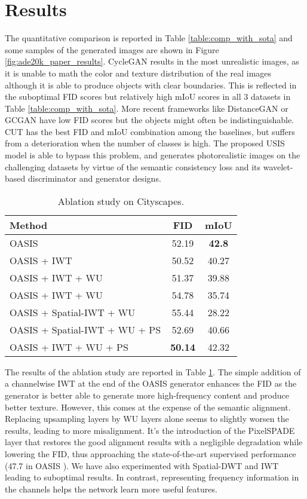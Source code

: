 \documentclass{article}
\begin{document}
 \vspace{-1.7em}
\section{Results}
\label{sec:results}
\vspace{-1em}
The quantitative comparison is reported in Table \ref{table:comp_with_sota} and some samples of the generated images are shown in Figure \ref{fig:ade20k_paper_results}. CycleGAN results in the most unrealistic images, as it is unable to math the color and texture distribution of the real images although it is able to produce objects with clear boundaries. This is reflected in the suboptimal FID scores but relatively high mIoU scores in all 3 datasets in Table \ref{table:comp_with_sota}. More recent frameworks like DistanceGAN or GCGAN have low FID scores but the objects might often be indistinguishable. CUT has the best FID and mIoU combination among the baselines, but suffers from a deterioration when the number of classes is high. The proposed USIS model is able to bypass this problem, and generates photorealistic images on the challenging datasets by virtue of the semantic consistency loss and its wavelet-based discriminator and generator designs.    
\begin{table}[h]
    \begin{tabular}{l|cc}
         Method & FID & mIoU  \\ 
         \hline
         OASIS                         & 52.19 & \textbf{42.8}  \\
         OASIS + IWT                   & 50.52 & 40.27 \\
         OASIS + IWT + WU              & 51.37 & 39.88 \\
         OASIS + IWT + WU        & 54.78 & 35.74 \\
         OASIS + Spatial-IWT + WU      & 55.44 & 28.22 \\
         OASIS + Spatial-IWT + WU + PS & 52.69 & 40.66 \\
         OASIS + IWT + WU + PS         & \textbf{50.14} & 42.32 \\
         
    \end{tabular}
\caption{Ablation study on Cityscapes.}
\label{tab:ablation}
\vspace{-1.5em}
\end{table} 
The results of the ablation study are reported in Table \ref{tab:ablation}. The simple addition of a channelwise IWT at the end of the OASIS generator enhances the FID as the generator is better able to generate more high-frequency content and produce better texture. However, this comes at the expense of the semantic alignment. Replacing upsampling layers by WU layers alone seems to slightly worsen the results, leading to more misalignment. It's the introduction of the PixelSPADE layer that restores the good alignment results with a negligible degradation while lowering the FID, thus approaching the state-of-the-art supervised performance (47.7 in OASIS \cite{schonfeld2021you}). We have also experimented with Spatial-DWT and IWT leading to suboptimal results. In contrast, representing frequency information in the channels helps the network learn more useful features.    
\end{document}
